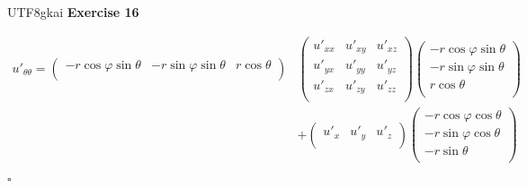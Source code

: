\documentclass{article}
\newenvironment{exercise}[1]{%
{\textbf{Exercise #1} \\ 
    }
}{
  \hfill $\square$ 
  \par\bigskip 
}
\newcommand{\parameter}[1]{\left(#1\right)}
\begin{document}
\begin{CJK}{UTF8}{gkai}
\begin{exercise}{16}
    \[\begin{aligned}    
    u'_{\theta\theta} = \begin{pmatrix}
        -r \cos \varphi \sin \theta&- r \sin \varphi \sin \theta &r \cos \theta\\ 
    \end{pmatrix}&
    \begin{pmatrix}
        u'_{xx}&u'_{xy}&u'_{xz}\\
        u'_{yx}&u'_{yy}&u'_{yz}\\
        u'_{zx}&u'_{zy}&u'_{zz}\\
    \end{pmatrix}
    \begin{pmatrix}
        -r \cos \varphi \sin \theta\\- r \sin \varphi \sin \theta \\r \cos \theta\\ 
    \end{pmatrix}\\
    &+
    \begin{pmatrix}
        u'_x&u'_y&u'_z\\
    \end{pmatrix}
    \begin{pmatrix}
        -r \cos \varphi \cos \theta\\- r \sin \varphi \cos \theta \\- r \sin \theta\\        
    \end{pmatrix}
    \end{aligned}
    \]
\end{exercise}


\end{CJK}
\end{document}
